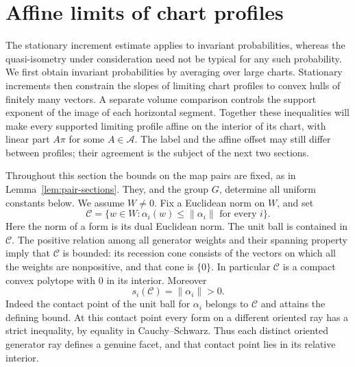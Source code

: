 \section{Affine limits of chart profiles}\label{sec:profiles}

The stationary increment estimate applies to invariant probabilities, whereas
the quasi-isometry under consideration need not be typical for any such
probability.  We first obtain invariant probabilities by averaging over large
charts.  Stationary increments then constrain the slopes of limiting chart
profiles to convex hulls of finitely many vectors.  A separate volume
comparison controls the support exponent of the image of each horizontal
segment.  Together these inequalities will make every supported limiting
profile affine on the interior of its chart, with linear part $A\pi$ for
some $A\in\mathcal A$.  The label and the affine offset may still differ
between profiles; their agreement is the subject of the next two sections.

Throughout this section the bounds on the map pairs are fixed, as in
Lemma~\ref{lem:pair-sections}.  They, and the group $G$, determine all
uniform constants below.  We assume $W\ne0$.  Fix a Euclidean norm on $W$,
and set
\begin{equation}\label{eq:profile-polytope}
 \mathcal C=\{w\in W:\alpha_i(w)\le\|\alpha_i\|
                         \text{ for every }i\}.
\end{equation}
Here the norm of a form is its dual Euclidean norm.  The unit ball is
contained in $\mathcal C$.  The positive relation among all generator
weights and their spanning property imply that $\mathcal C$ is bounded:
its recession cone consists of the vectors on which all the weights are
nonpositive, and that cone is $\{0\}$.  In particular $\mathcal C$ is a
compact convex polytope with $0$ in its interior.  Moreover
\[
 s_i(\mathcal C)=\|\alpha_i\|>0.
\]
Indeed the contact point of the unit ball for $\alpha_i$ belongs to
$\mathcal C$ and attains the defining bound.  At this contact point every
form on a different oriented ray has a strict inequality, by equality in
Cauchy--Schwarz.  Thus each distinct oriented generator ray defines a
genuine facet, and that contact point lies in its relative interior.

